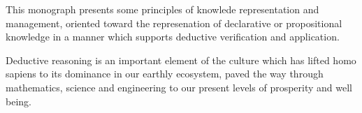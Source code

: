 ﻿This monograph presents some principles of knowlede representation and management, oriented toward the represenation of declarative or propositional knowledge in a manner which supports deductive verification and application.

Deductive reasoning is an important element of the culture which has lifted homo sapiens to its dominance in our earthly ecosystem, paved the way through mathematics, science and engineering to our present levels of prosperity and well being.
